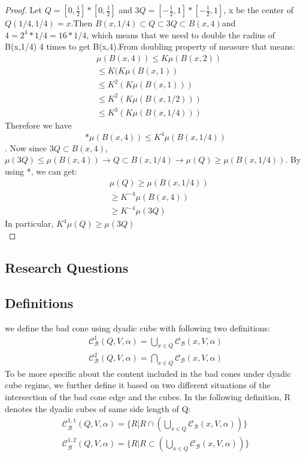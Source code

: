 \documentclass{article}
\begin{document}
\begin{itemize}
\begin{proof}
Let $Q = [0,\frac{1}{2}]*[0,\frac{1}{2}]$ and $3Q = [-\frac{1}{2},1]*[-\frac{1}{2},1]$, x be the center of $Q(1/4,1/4) = x$.Then $B(x, 1/4) \subset Q \subset 3Q \subset B(x,4)$and $4 = 2^4 * 1/4 = 16*1/4$, which means that we need to double the radius of B(x,1/4) 4 times to get B(x,4).From doubling property of measure that means:
\begin{align*}
&\mu(B(x,4)) \leq K\mu(B(x,2))\\
&\leq K(K\mu(B(x,1))\\
&\leq K^2(K\mu(B(x,1)))\\
&\leq K^2(K\mu(B(x,1/2)))\\
&\leq K^3(K\mu(B(x,1/4)))
\end{align*}
Therefore we have \[*\mu(B(x,4))\leq K^4\mu(B(x,1/4))\].
Now since $3Q\subset B(x,4)$, $\mu(3Q)\leq \mu(B(x,4))\rightarrow Q \subset B(x,1/4)\rightarrow \mu(Q) \geq \mu(B(x,1/4))$. By using *, we can get:
\begin{align*}
&\mu(Q) \geq \mu(B(x,1/4))\\
&\geq K^{-4}\mu(B(x,4))\\
&\geq K^{-4}\mu(3Q)
\end{align*}
In particular, $K^4\mu(Q)\geq\mu(3Q)$\\
\end{proof}


\end{itemize}

\subsection{Research Questions} 
\subsection{Definitions}
we define the bad cone using dyadic cube with following two definitions:
\begin{align}
   \mathcal{C}^{1}_\mathcal{B}(Q,V,\alpha) = \bigcup_{x\in Q}\mathcal{C}_\mathcal{B}(x,V,\alpha)\\
    \mathcal{C}^{2}_\mathcal{B}(Q,V,\alpha) = \bigcap_{x\in Q}\mathcal{C}_\mathcal{B}(x,V,\alpha)
\end{align}
To be more specific about the content included in the bad cones under dyadic cube regime, we further define it based on two different situations of the intersection of the bad cone edge and the cubes. In the following definition, R denotes the dyadic cubes of same side length of Q:
\begin{align}
   \mathcal{C}^{1,1}_\mathcal{B}(Q,V,\alpha) = \{R|R\cap(\bigcup_{x\in Q}\mathcal{C}_\mathcal{B}(x,V,\alpha))\}\\
    \mathcal{C}^{1,2}_\mathcal{B}(Q,V,\alpha) = \{R|R\subset(\bigcup_{x\in Q}\mathcal{C}_\mathcal{B}(x,V,\alpha))\}
\end{align}
\end{document}
